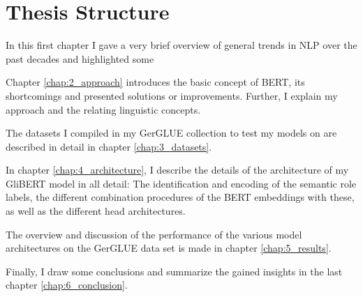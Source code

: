 \section{Thesis Structure}

In this first chapter I gave a very brief overview of general trends in
NLP over the past decades and highlighted some

Chapter \ref{chap:2_approach} introduces the basic concept of BERT,
its shortcomings and presented solutions or improvements. Further,
I explain my approach and the relating linguistic concepts.

The datasets I compiled in my GerGLUE collection to test my models on are described in detail in
chapter \ref{chap:3_datasets}.

In chapter \ref{chap:4_architecture}, I describe the details of the architecture of
my GliBERT model in all detail: The identification and encoding of the semantic role
labels, the different combination procedures of the BERT embeddings with these, as
well as the different head architectures.

The overview and discussion of the performance of the various model architectures on
the GerGLUE data set is made in chapter \ref{chap:5_results}.

Finally, I draw some conclusions and summarize the gained insights in the last chapter \ref{chap:6_conclusion}.

